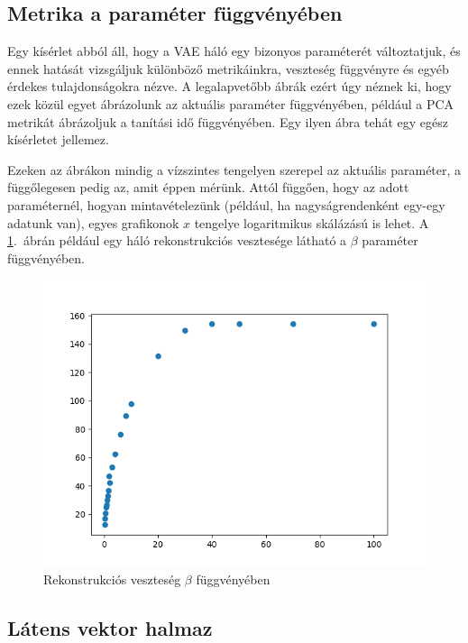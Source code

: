 \subsection{Metrika a paraméter függvényében}

Egy kísérlet abból áll, hogy a VAE háló egy bizonyos paraméterét változtatjuk, és ennek hatását vizsgáljuk különböző metrikáinkra, veszteség függvényre és egyéb érdekes tulajdonságokra nézve. A legalapvetőbb ábrák ezért úgy néznek ki, hogy ezek közül egyet ábrázolunk az aktuális paraméter függvényében, például a PCA metrikát ábrázoljuk a tanítási idő függvényében. Egy ilyen ábra tehát egy egész kísérletet jellemez.

Ezeken az ábrákon mindig a vízszintes tengelyen szerepel az aktuális paraméter, a függőlegesen pedig az, amit éppen mérünk. Attól függően, hogy az adott paraméternél, hogyan mintavételezünk (például, ha nagyságrendenként egy-egy adatunk van), egyes grafikonok $x$ tengelye logaritmikus skálázású is lehet. A \ref{mgraph}.~ábrán például egy háló rekonstrukciós vesztesége látható a $\beta$ paraméter függvényében.

\begin{figure}[h!]
\begin{center}
 
  
	\begin{center}
	\includegraphics[width=0.75\linewidth]{vae_beta-loss.png}
	\end{center}
	
  \caption{Rekonstrukciós veszteség $\beta$ függvényében} \label{mgraph}
\end{center}
\end{figure}

\subsection{Látens vektor halmaz}

